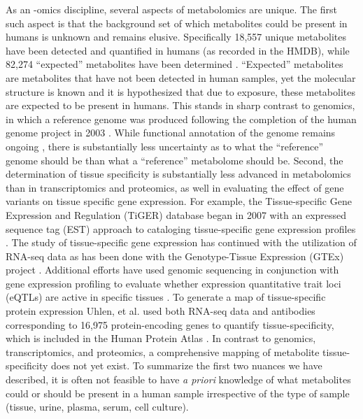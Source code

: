 \begin{DoubleSpace*}
As an -omics discipline, several aspects of metabolomics are unique. The first such aspect is that the background set of which metabolites could be present in humans is unknown and remains elusive. Specifically 18,557 unique metabolites have been detected and quantified in humans (as recorded in the HMDB), while 82,274 ``expected'' metabolites have been determined \cite{wishart2018}. ``Expected'' metabolites are metabolites that have not been detected in human samples, yet the molecular structure is known and it is hypothesized that due to exposure, these metabolites are expected to be present in humans. This stands in sharp contrast to genomics, in which a reference genome was produced following the completion of the human genome project in 2003 \cite{collins2003,oleary2016}. While functional annotation of the genome remains ongoing \cite{oleary2016}, there is substantially less uncertainty as to what the ``reference'' genome should be than what a ``reference'' metabolome should be. Second, the determination of tissue specificity is substantially less advanced in metabolomics than in transcriptomics and proteomics, as well in evaluating the effect of gene variants on tissue specific gene expression. For example, the Tissue-specific Gene Expression and Regulation (TiGER) database began in 2007 with an expressed sequence tag (EST) approach to cataloging tissue-specific gene expression profiles \cite{liu2008}. The study of tissue-specific gene expression has continued with the utilization of RNA-seq data as has been done with the Genotype-Tissue Expression (GTEx) project \cite{lonsdale2013}. Additional efforts have used genomic sequencing in conjunction with gene expression profiling to evaluate whether expression quantitative trait loci (eQTLs) are active in specific tissues \cite{aguet2017,brown2017}. To generate a map of tissue-specific protein expression Uhlen, et al. \cite{uhlen2015} used both RNA-seq data and antibodies corresponding to 16,975 protein-encoding genes to quantify tissue-specificity, which is included in the Human Protein Atlas \cite{uhlen2010}. In contrast to genomics, transcriptomics, and proteomics, a comprehensive mapping of metabolite tissue-specificity does not yet exist. To summarize the first two nuances we have described, it is often not feasible to have \emph{a priori} knowledge of what metabolites could or should be present in a human sample irrespective of the type of sample (tissue, urine, plasma, serum, cell culture). 


\end{DoubleSpace*}
